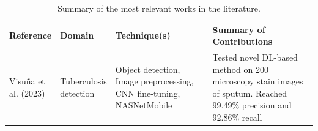 \documentclass[../main.tex]{subfiles}
\begin{document}
    \newpage
    \begin{table}[p]
        \caption{Summary of the most relevant works in the literature.}
        \label{tab:sota_summary}
        \hspace*{-1.5cm}
        \begin{tabular}{
            p{0.14\linewidth} | p{0.13\linewidth} | p{0.35\linewidth} | p{0.5\linewidth} 
        }
        \toprule
        \textbf{Reference} & \textbf{Domain} &\textbf{Technique(s)} & \textbf{Summary of Contributions} \\
        \midrule
        Visuña et al. (2023) \cite{visuna_novel_2023} & Tuberculosis detection & Object detection, Image preprocessing, CNN fine-tuning, NASNetMobile & Tested novel DL-based method on 200 microscopy stain images of sputum. Reached  99.49\% precision and 92.86\% recall \\
        \bottomrule
        \end{tabular}
    \end{table}


   
    
\end{document}
